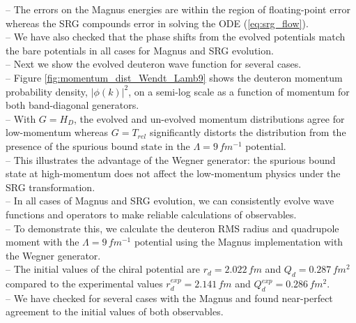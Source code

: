 \documentclass[preprintnumbers,floatfix,aps,prc,preprint,nofootinbib]{revtex4-1}
\begin{document}
-- The errors on the Magnus energies are within the region of floating-point error whereas the SRG compounds error in solving the ODE (\ref{eq:srg_flow}).
\\
-- We have also checked that the phase shifts from the evolved potentials match the bare potentials in all cases for Magnus and SRG evolution.
\\ 
-- Next we show the evolved deuteron wave function for several cases.
\\
-- Figure \ref{fig:momentum_dist_Wendt_Lamb9} shows the deuteron momentum probability density, $|\phi(k)|^2$, on a semi-log scale as a function of momentum for both band-diagonal generators.
\\
-- With $G=H_D$, the evolved and un-evolved momentum distributions agree for low-momentum whereas $G=T_{rel}$ significantly distorts the distribution from the presence of the spurious bound state in the $\Lambda=9 \, fm^{-1}$ potential.
\\
-- This illustrates the advantage of the Wegner generator: the spurious bound state at high-momentum does not affect the low-momentum physics under the SRG transformation.
\\
-- In all cases of Magnus and SRG evolution, we can consistently evolve wave functions and operators to make reliable calculations of observables.
\\
-- To demonstrate this, we calculate the deuteron RMS radius and quadrupole moment with the $\Lambda=9 \, fm^{-1}$ potential using the Magnus implementation with the Wegner generator.
\\
-- The initial values of the chiral potential are $r_d = 2.022 \, fm$ and $Q_d = 0.287 \, fm^2$ compared to the experimental values $r_d^{exp} = 2.141 \, fm$ and $Q_d^{exp} = 0.286 \, fm^2$. 
\\
-- We have checked for several cases with the Magnus and found near-perfect agreement to the initial values of both observables.
\\
\end{document}
